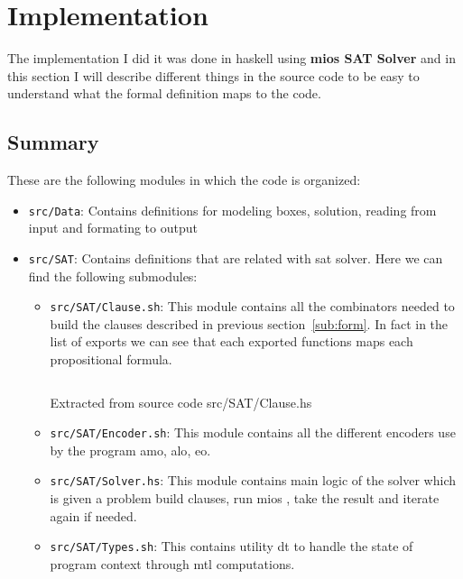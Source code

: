 \documentclass[12pt, a4paper]{article}
\begin{document}
\section{Implementation}
The implementation I did it was done in \acrfull{haskell} using \textbf{mios SAT Solver} \cite{mios} and in this section I will describe different things in the source code to be easy to understand what the formal definition maps to the code.

\subsection{Summary}
These are the following modules in which the code is organized:

\begin{itemize}
  \item \texttt{src/Data}: Contains definitions for modeling boxes, solution, reading from input and formating to output
  \item \texttt{src/SAT}: Contains definitions that are related with \acrshort{sat} solver. Here we can find the following submodules:
    \begin{itemize}
      \item \texttt{src/SAT/Clause.sh}: This module contains all the combinators needed to build the clauses described in previous section~\ref{sub:form}. In fact in the list of exports we can see that each exported functions maps each propositional formula.
          \begin{listing}[H]
            \inputminted[firstline=13, lastline=18, linenos, breaklines]{haskell}{../src/SAT/Clause.hs}
            \caption{Extracted from source code src/SAT/Clause.hs}
            \label{src:sat:1}
          \end{listing}
        \item \texttt{src/SAT/Encoder.sh}: This module contains all the different encoders use by the program \acrfull{amo}, \acrfull{alo}, \acrfull{eo}.
        \item \texttt{src/SAT/Solver.hs}: This module contains main logic of the solver which is given a problem build clauses, run mios \cite{mios}, take the result and iterate again if needed.
        \item \texttt{src/SAT/Types.sh}: This contains utility \acrfull{dt} to handle the state of program context through \acrfull{mtl}\cite{mtl} computations.
    \end{itemize}
\end{itemize}
\end{document}
